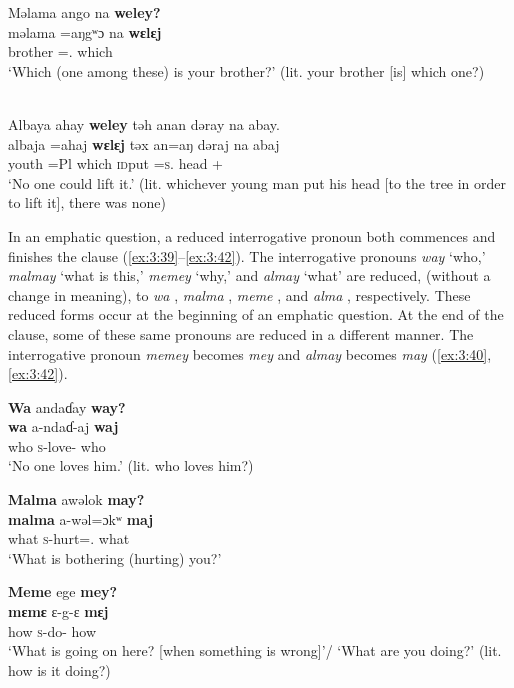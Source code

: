 \ea \label{ex:3:37}
Məlama  ango  na  \textbf{weley?}\\
\gll  məlama     =aŋgʷɔ     na   \textbf{wɛlɛj}\\
      brother    ={\twoS}.{\POSS}  {\PSP}  which\\
\glt  ‘Which (one among these) is your brother?’ (lit. your brother [is] which one?)
\z


\ea \label{ex:3:38}\\
Albaya  ahay  \textbf{weley} təh  anan  dəray  na  abay.\\
\gll  albaja   =ahaj   \textbf{wɛlɛj}  təx     an=aŋ         dəraj   na  abaj\\
      youth    =Pl    which   \textsc{id}put   {\DAT}=\textsc{s}.{\IO}   head   {\PSP}   {\EXT}+{\NEG}\\
\glt  ‘No one could lift it.’ (lit. whichever young man put his head [to the tree in order to lift it], there was none)
\z

In an emphatic question, a reduced interrogative pronoun both commences and finishes the clause (\ref{ex:3:39}--\ref{ex:3:42}). The interrogative pronouns \textit{way} ‘who,’ \textit{malmay} ‘what is this,’ \textit{memey} ‘why,’ and \textit{almay} ‘what’ are reduced, (without a change in meaning), to \textit{wa} , \textit{malma} , \textit{meme} , and \textit{alma} , respectively. These reduced forms occur at the beginning of an emphatic question. At the end of the clause, some of these same pronouns are reduced in a different manner. The interrogative pronoun \textit{memey} becomes \textit{mey}  and \textit{almay} becomes \textit{may} (\ref{ex:3:40}, \ref{ex:3:42}).

\ea \label{ex:3:39}
\textbf{Wa}  andaɗay  \textbf{way?}\\
\gll  \textbf{wa}    a-ndaɗ-aj   \textbf{waj}\\
      who    \textsc{s}-love-{\CL}  who\\
\glt  ‘No one loves him.’ (lit. who loves him?)
\z

\ea \label{ex:3:40}
\textbf{Malma}  awəlok \textbf{may?}\\
\gll  \textbf{malma}   a-wəl=ɔkʷ   \textbf{maj}\\
      what  \textsc{s}-hurt={\twoS}.{\IO}  what\\
\glt  ‘What is bothering (hurting) you?’
\z

\ea \label{ex:3:41}
\textbf{Meme}  ege  \textbf{mey?}\\
\gll  \textbf{mɛmɛ}   ɛ{}-g-ɛ     \textbf{mɛj}\\
      how    \textsc{s}-do-{\CL}  how\\
\glt  ‘What is going on here? [when something is wrong]’/ ‘What are you doing?’ (lit. how is it doing?)
\z

